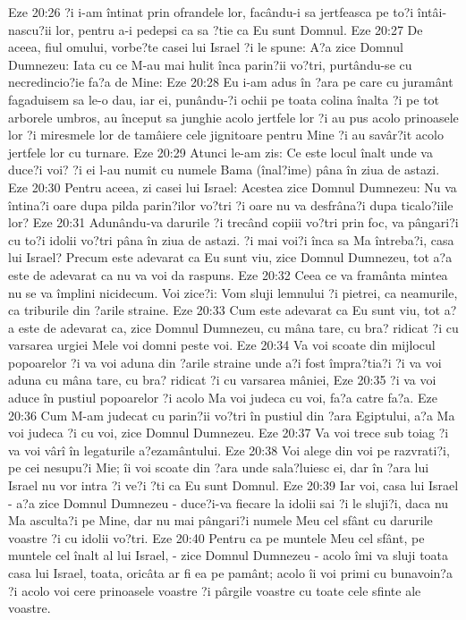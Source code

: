 Eze 20:26  ?i i-am întinat prin ofrandele lor, facându-i sa jertfeasca pe to?i întâi-nascu?ii lor, pentru a-i pedepsi ca sa ?tie ca Eu sunt Domnul.
Eze 20:27  De aceea, fiul omului, vorbe?te casei lui Israel ?i le spune: A?a zice Domnul Dumnezeu: Iata cu ce M-au mai hulit înca parin?ii vo?tri, purtându-se cu necredincio?ie fa?a de Mine:
Eze 20:28  Eu i-am adus în ?ara pe care cu juramânt fagaduisem sa le-o dau, iar ei, punându-?i ochii pe toata colina înalta ?i pe tot arborele umbros, au început sa junghie acolo jertfele lor ?i au pus acolo prinoasele lor ?i miresmele lor de tamâiere cele jignitoare pentru Mine ?i au savâr?it acolo jertfele lor cu turnare.
Eze 20:29  Atunci le-am zis: Ce este locul înalt unde va duce?i voi? ?i ei l-au numit cu numele Bama (înal?ime) pâna în ziua de astazi.
Eze 20:30  Pentru aceea, zi casei lui Israel: Acestea zice Domnul Dumnezeu: Nu va întina?i oare dupa pilda parin?ilor vo?tri ?i oare nu va desfrâna?i dupa ticalo?iile lor?
Eze 20:31  Adunându-va darurile ?i trecând copiii vo?tri prin foc, va pângari?i cu to?i idolii vo?tri pâna în ziua de astazi. ?i mai voi?i înca sa Ma întreba?i, casa lui Israel? Precum este adevarat ca Eu sunt viu, zice Domnul Dumnezeu, tot a?a este de adevarat ca nu va voi da raspuns.
Eze 20:32  Ceea ce va framânta mintea nu se va împlini nicidecum. Voi zice?i: Vom sluji lemnului ?i pietrei, ca neamurile, ca triburile din ?arile straine.
Eze 20:33  Cum este adevarat ca Eu sunt viu, tot a?a este de adevarat ca, zice Domnul Dumnezeu, cu mâna tare, cu bra? ridicat ?i cu varsarea urgiei Mele voi domni peste voi.
Eze 20:34  Va voi scoate din mijlocul popoarelor ?i va voi aduna din ?arile straine unde a?i fost împra?tia?i ?i va voi aduna cu mâna tare, cu bra? ridicat ?i cu varsarea mâniei,
Eze 20:35  ?i va voi aduce în pustiul popoarelor ?i acolo Ma voi judeca cu voi, fa?a catre fa?a.
Eze 20:36  Cum M-am judecat cu parin?ii vo?tri în pustiul din ?ara Egiptului, a?a Ma voi judeca ?i cu voi, zice Domnul Dumnezeu.
Eze 20:37  Va voi trece sub toiag ?i va voi vârî în legaturile a?ezamântului.
Eze 20:38  Voi alege din voi pe razvrati?i, pe cei nesupu?i Mie; îi voi scoate din ?ara unde sala?luiesc ei, dar în ?ara lui Israel nu vor intra ?i ve?i ?ti ca Eu sunt Domnul.
Eze 20:39  Iar voi, casa lui Israel - a?a zice Domnul Dumnezeu - duce?i-va fiecare la idolii sai ?i le sluji?i, daca nu Ma asculta?i pe Mine, dar nu mai pângari?i numele Meu cel sfânt cu darurile voastre ?i cu idolii vo?tri.
Eze 20:40  Pentru ca pe muntele Meu cel sfânt, pe muntele cel înalt al lui Israel, - zice Domnul Dumnezeu - acolo îmi va sluji toata casa lui Israel, toata, oricâta ar fi ea pe pamânt; acolo îi voi primi cu bunavoin?a ?i acolo voi cere prinoasele voastre ?i pârgile voastre cu toate cele sfinte ale voastre.
